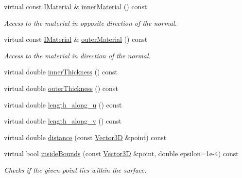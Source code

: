 \begin{DoxyCompactItemize}
\item 
virtual const \hyperlink{class_d_d_surfaces_1_1_i_material}{IMaterial} \& \hyperlink{class_d_d4hep_1_1_d_d_rec_1_1_vol_surface_base_a55f7258fad63f0224e7f5db301596baf}{innerMaterial} () const 
\begin{DoxyCompactList}\small\item\em Access to the material in opposite direction of the normal. \item\end{DoxyCompactList}\item 
virtual const \hyperlink{class_d_d_surfaces_1_1_i_material}{IMaterial} \& \hyperlink{class_d_d4hep_1_1_d_d_rec_1_1_vol_surface_base_a26269d37153a91b4f23ea05b97504ab4}{outerMaterial} () const 
\begin{DoxyCompactList}\small\item\em Access to the material in direction of the normal. \item\end{DoxyCompactList}\item 
virtual double \hyperlink{class_d_d4hep_1_1_d_d_rec_1_1_vol_surface_base_ad47a7a1236d529ba5263bc5bf9bd3fbc}{innerThickness} () const 
\item 
virtual double \hyperlink{class_d_d4hep_1_1_d_d_rec_1_1_vol_surface_base_a2b6e77c50e5b060711b9fcae604d5864}{outerThickness} () const 
\item 
virtual double \hyperlink{class_d_d4hep_1_1_d_d_rec_1_1_vol_surface_base_a11c8c2074c8f0e4af494aa6802be9372}{length\_\-along\_\-u} () const 
\item 
virtual double \hyperlink{class_d_d4hep_1_1_d_d_rec_1_1_vol_surface_base_a28732fc0788f9f53c3811303b852b470}{length\_\-along\_\-v} () const 
\item 
virtual double \hyperlink{class_d_d4hep_1_1_d_d_rec_1_1_vol_surface_base_afb85bf6e8e6b87fb52e67e26609b1048}{distance} (const \hyperlink{class_d_d_surfaces_1_1_vector3_d}{Vector3D} \&point) const 
\item 
virtual bool \hyperlink{class_d_d4hep_1_1_d_d_rec_1_1_vol_surface_base_aae8b494969fd257e4aa3e5b3d80cebb8}{insideBounds} (const \hyperlink{class_d_d_surfaces_1_1_vector3_d}{Vector3D} \&point, double epsilon=1e-\/4) const 
\begin{DoxyCompactList}\small\item\em Checks if the given point lies within the surface. \item\end{DoxyCompactList}\item 

\end{DoxyCompactItemize}
